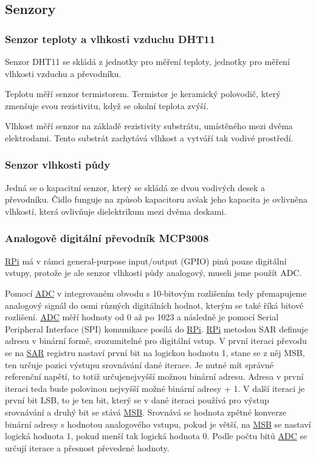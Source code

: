 \documentclass[czech,12pt,a4paper]{article}
\begin{document}
\subsection{Senzory}

\subsubsection{Senzor teploty a vlhkosti vzduchu DHT11}

Senzor \ac{DHT11} se skládá z jednotky pro měření teploty, jednotky pro měření vlhkosti vzduchu a převodníku.

Teplotu měří senzor termistorem. Termistor je keramický polovodič, který zmenšuje svou rezistivitu, když se okolní teplota zvýší.

Vlhkost měří senzor na základě rezistivity substrátu, umístěného mezi dvěma elektrodami. Tento substrát zachytává vlhkost a vytváří tak vodivé prostředí.

\subsubsection{Senzor vlhkosti půdy}

Jedná se o kapacitní senzor, který se skládá ze dvou vodivých desek a převodníku. Čidlo funguje na způsob kapacitoru avšak jeho kapacita je ovlivněna vlhkostí, která ovlivňuje dielektrikum mezi dvěma deskami.

\subsubsection{Analogově digitální převodník MCP3008}

\underline{\ac{RPi}} má v rámci general-purpose input/output (GPIO) pinů pouze digitální vstupy, protože je ale senzor vlhkosti půdy analogový, museli jsme použít \ac{ADC}.

Pomocí \underline{\ac{ADC}} v integrovaném obvodu s 10-bitovým rozlišením tedy přemapujeme analogový signál do osmi různých digitálních hodnot, kterým se také říká bitové rozlišení. \underline{\ac{ADC}} měří hodnoty od 0 až po 1023 a následně je pomocí Serial Peripheral Interface (SPI) komunikace posílá do \underline{\ac{RPi}}. \underline{\ac{RPi}} metodou \ac{SAR} definuje adresu v binární formě, srozumitelné pro digitální vstup. V první iteraci převodu se na \underline{\ac{SAR}} registru nastaví první bit na logickou hodnotu 1, stane se z něj \ac{MSB}, ten určuje pozici výstupu srovnávání dané iterace. Je nutné mít správné referenční napětí, to totiž určuje\linebreak nejvyšší možnou binární adresu. Adresa v první iteraci teda bude polovinou nejvyšší možné binární adresy + 1. V další iteraci je první bit \ac{LSB}, to je ten bit, který se v dané iteraci používá pro výstup srovnávání a druhý bit se stává \underline{\ac{MSB}}. Srovnává se hodnota zpětné konverze binární adresy s hodnotou analogového vstupu, pokud je větší, na \underline{\ac{MSB}} se nastaví logická hodnota 1, pokud menší tak logická hodnota 0. Podle počtu bitů \underline{\ac{ADC}} se určují iterace a přesnost převedené hodnoty.
\end{document}
